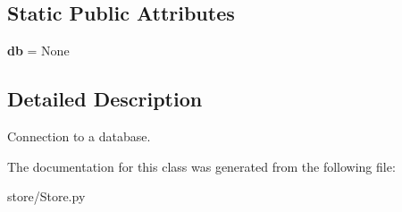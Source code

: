 \subsection*{Static Public Attributes}
\begin{DoxyCompactItemize}
\item 
\hypertarget{classstore_1_1_store_1_1_store_a6754b91f4ccb0614f3b48695e60ecac8}{{\bfseries db} = None}\label{classstore_1_1_store_1_1_store_a6754b91f4ccb0614f3b48695e60ecac8}

\end{DoxyCompactItemize}


\subsection{Detailed Description}
Connection to a database. 

The documentation for this class was generated from the following file\-:\begin{DoxyCompactItemize}
\item 
store/Store.\-py\end{DoxyCompactItemize}
